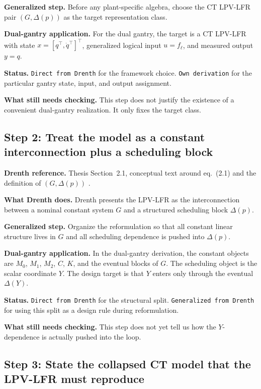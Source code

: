 ﻿\documentclass[11pt]{article}
\newcommand{\audititem}[2]{\par\smallskip\noindent\textbf{#1.} #2\par}
\newcommand{\statusline}[1]{\texttt{#1}}
\begin{document}
\audititem{Generalized step}{Before any plant-specific algebra, choose the CT
LPV-LFR pair $(G,\Delta(p))$ as the target representation class.}

\audititem{Dual-gantry application}{For the dual gantry, the target is a CT
LPV-LFR with state $x = [q^\top,\dot{q}^\top]^\top$, generalized logical input
$u = f_\ell$, and measured output $y = q$.}

\audititem{Status}{\statusline{Direct from Drenth} for the framework choice.
\statusline{Own derivation} for the particular gantry state, input, and output
assignment.}

\audititem{What still needs checking}{This step does not justify the existence
of a convenient dual-gantry realization. It only fixes the target class.}

\subsection{Step 2: Treat the model as a constant interconnection plus a scheduling block}

\audititem{Drenth reference}{Thesis Section~2.1, conceptual text around
eq.~(2.1) and the definition of $(G,\Delta(p))$ \cite{drenth2025thesis}.}

\audititem{What Drenth does}{Drenth presents the LPV-LFR as the interconnection
between a nominal constant system $G$ and a structured scheduling block
$\Delta(p)$.}

\audititem{Generalized step}{Organize the reformulation so that all constant
linear structure lives in $G$ and all scheduling dependence is pushed into
$\Delta(p)$.}

\audititem{Dual-gantry application}{In the dual-gantry derivation, the constant
objects are $M_0$, $M_1$, $M_2$, $C$, $K$, and the eventual blocks of $G$.
The scheduling object is the scalar coordinate $Y$. The design target is that
$Y$ enters only through the eventual $\Delta(Y)$.}

\audititem{Status}{\statusline{Direct from Drenth} for the structural split.
\statusline{Generalized from Drenth} for using this split as a design rule
during reformulation.}

\audititem{What still needs checking}{This step does not yet tell us how the
$Y$-dependence is actually pushed into the loop.}

\subsection{Step 3: State the collapsed CT model that the LPV-LFR must reproduce}
\end{document}
